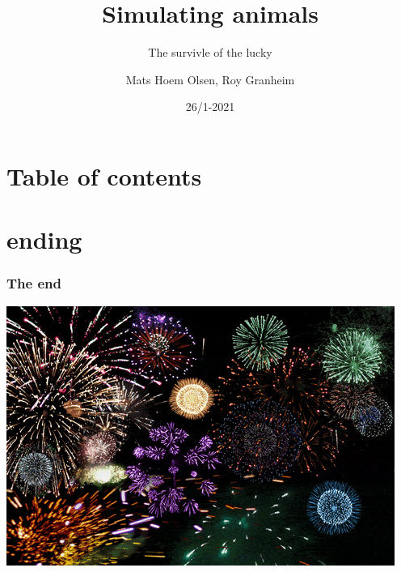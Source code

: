 \documentclass[12pt]{beamer}
\begin{document}
\author{Mats Hoem Olsen, Roy Granheim}
\title{Simulating animals}
\subtitle{The survivle of the lucky}
\date{26/1-2021}
\subject{INF200}

\begin{frame}
\maketitle
\end{frame}

\section{Table of contents}
\begin{frame}
\tableofcontents
\end{frame}

\setcounter{section}{0}




\section{ending}
\begin{frame}
	\frametitle{The end}
	
	\includegraphics[width = \textwidth]{test/firework-9}
	

\end{frame}
\end{document}
